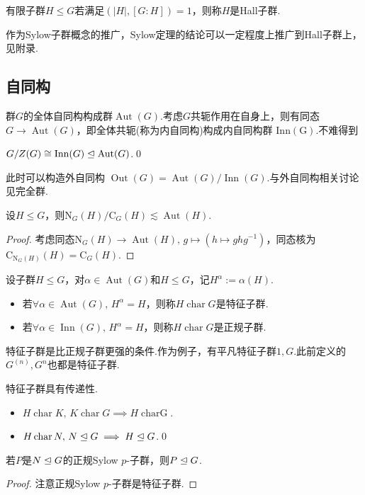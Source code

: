 有限子群$H\le G$若满足$(|H|,[G:H])=1$，则称$H$是{\heiti Hall子群}.

作为Sylow子群概念的推广，Sylow定理的结论可以一定程度上推广到Hall子群上，见附录.%
\subsection{自同构}
群$G$的全体自同构构成群$\operatorname*{Aut}(G)$.考虑$G$共轭作用在自身上，则有同态$G\to\operatorname*{Aut}(G)$，即全体共轭(称为{\heiti 内自同构})构成{\heiti 内自同构群} $\operatorname*{Inn(G)}$.不难得到
\begin{prop}
	$G/Z(G)\cong\operatorname*{Inn}(G)\trianglelefteq\operatorname*{Aut}(G)$.\qed
\end{prop}

此时可以构造{\heiti 外自同构} $\operatorname*{Out}(G)=\operatorname*{Aut}(G)/\operatorname*{Inn}(G)$.与外自同构相关讨论见完全群.%

\begin{thm}[(N/C定理)]
	设$H\le G$，则$\mathrm{N}_G(H)/\mathrm{C}_G(H)\lesssim\operatorname*{Aut}(H)$.
\end{thm}
\begin{proof}
	考虑同态$\mathrm{N}_G(H)\to\operatorname*{Aut}(H),\,g\mapsto(h\mapsto ghg^{-1})$，同态核为$\mathrm{C}_{\mathrm{N}_G(H)}(H)=\mathrm{C}_G(H)$.
\end{proof}

\begin{definition}
	设子群$H\le G$，对$\alpha\in\operatorname*{Aut}(G)$和$H\le G$，记$H^\alpha:=\alpha(H)$.
	\begin{itemize}
		\item 若$\forall\alpha\in\operatorname*{Aut}(G),\,H^\alpha=H$，则称$H\operatorname*{char}G$是{\heiti 特征子群}.
		\item 若$\forall\alpha\in\operatorname*{Inn}(G),\,H^\alpha=H$，则称$H\operatorname*{char}G$是{\heiti 正规子群}.
	\end{itemize}
\end{definition}

特征子群是比正规子群更强的条件.作为例子，有平凡特征子群$1,G$.此前定义的$G^{(n)},G^n$也都是特征子群.
\begin{prop}
	特征子群具有传递性.
	\begin{itemize}
		\item $H\operatorname*{char}K,\,K\operatorname*{char} G\implies H\operatorname*{char G}$.
		\item $H\operatorname*{char} N,\,N\trianglelefteq G\implies H\trianglelefteq G$.\qed
	\end{itemize}
\end{prop}
\begin{cor}
	若$P$是$N\trianglelefteq G$的正规Sylow $p$-子群，则$P\trianglelefteq G$.
\end{cor}
\begin{proof}
	注意正规Sylow $p$-子群是特征子群.
\end{proof}

